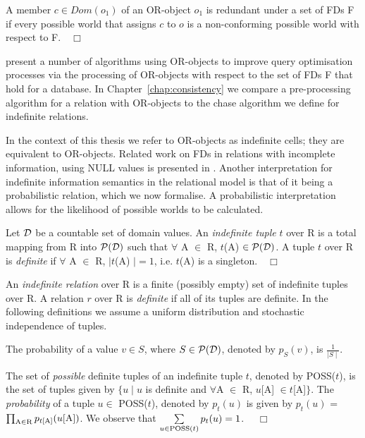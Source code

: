 \begin{definition}
\begin{rm}
A member $c \in Dom(o_1)$ of an OR-object $o_1$ is redundant under a set of
FDs F if every possible world that assigns $c$ to $o$ is
a non-conforming possible world with respect to F.$\quad\Box$
\end{rm}
\end{definition}

\cite{vn95} present a number of algorithms using OR-objects to improve query 
optimisation processes via the processing of OR-objects with respect to the
set of FDs F that hold for a database. In
Chapter~\ref{chap:consistency} we compare a pre-processing algorithm
for a relation with OR-objects to the chase algorithm we define for
indefinite relations.

\smallskip

In the context of this thesis we
refer to OR-objects as indefinite cells; they are equivalent to OR-objects.
Related
work on FDs in relations with incomplete information, using NULL
values is presented in \cite{ll98,lv97}. 
Another interpretation for indefinite information semantics in the
relational model is that of it being a probabilistic relation, which
we now formalise. A probabilistic interpretation allows for the
likelihood of possible worlds to be calculated.

\begin{definition}
\begin{rm}
Let $\cal D$ be a countable set of domain values.
An {\em indefinite tuple} $t$ over R 
is a total mapping from R into ${\cal P}({\cal D})$ 
such that $\forall$ A $\in$ R, $t$(A) $\in {\cal P}({\cal D})$.
A tuple $t$ over R is {\em definite} if 
$\forall$ A $\in$ R, $\mid t$(A) $\mid = 1$, i.e. $t$(A) is a
singleton.$\quad\Box$ 
\end{rm}
\end{definition}

An {\em indefinite relation} over R 
is a finite (possibly empty) set of indefinite tuples over R.
A relation $r$ over R is {\em definite} if all of its tuples are definite.
In the following definitions we assume a uniform distribution and
stochastic independence of tuples.

\begin{definition}
\begin{rm}
The probability of a value $v \in S$, where  $S \in {\cal P}({\cal D})$,
denoted by $p_S(v)$, is $\frac{1}{\mid S \mid}$.

\smallskip

The set of {\em possible} definite tuples of an indefinite tuple $t$, 
denoted by POSS($t$), is the set of tuples given by $\{u \mid u$ is
definite and $\forall$A $\in$ R, $u$[A] $\in t$[A]$\}$. The {\em probability}
of a tuple $u \in$ POSS($t$), denoted by $p_t(u)$ is given by $p_t(u)$
= $\prod_{{\rm A} \in {\rm R}} p_{t[{\rm A}]}(u[{\rm A}])$. We observe
that $\sum\limits_{u \in {\rm POSS}(t)} p_t(u) = 1$.  $\quad\Box$
\end{rm}
\end{definition}



